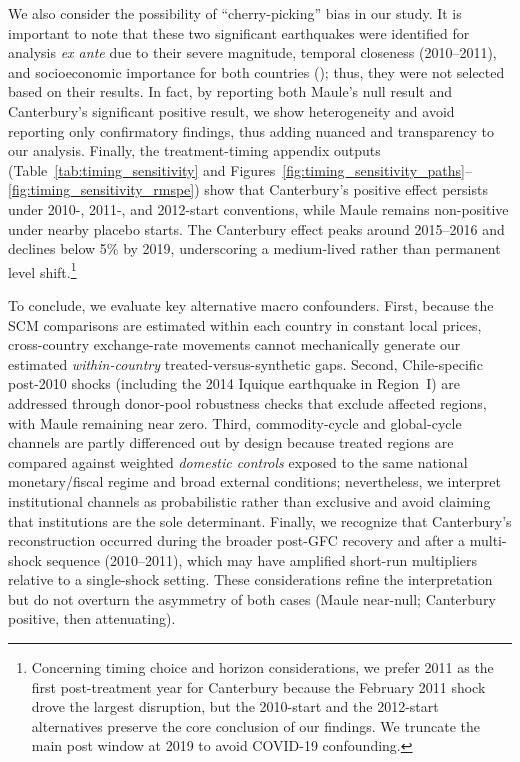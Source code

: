 \documentclass[12pt]{article}
\begin{document}
We also consider the possibility of “cherry-picking” bias \autocite{ferman2020cherry} in our study. It is important to note that these two significant earthquakes were identified for analysis \textit{ ex ante} due to their severe magnitude, temporal closeness (2010–2011), and socioeconomic importance for both countries (\cite{dussaillant2014trust, cardenasjiron2012chilean, eqc2017annual, miller2013estimating}); thus, they were not selected based on their results. In fact, by reporting both Maule’s null result and Canterbury's significant positive result, we show heterogeneity and avoid reporting only confirmatory findings, thus adding nuanced and transparency to our analysis. Finally, the treatment-timing appendix outputs (Table~\ref{tab:timing_sensitivity} and Figures~\ref{fig:timing_sensitivity_paths}--\ref{fig:timing_sensitivity_rmspe}) show that Canterbury’s positive effect persists under 2010-, 2011-, and 2012-start conventions, while Maule remains non-positive under nearby placebo starts. The Canterbury effect peaks around 2015--2016 and declines below 5\% by 2019, underscoring a medium-lived rather than permanent level shift.\footnote{Concerning timing choice and horizon considerations, we prefer 2011 as the first post-treatment year for Canterbury because the February 2011 shock drove the largest disruption, but the 2010-start and the 2012-start alternatives preserve the core conclusion of our findings. We truncate the main post window at 2019 to avoid COVID-19 confounding.}

To conclude, we evaluate key alternative macro confounders. First, because the SCM comparisons are estimated within each country in constant local prices, cross-country exchange-rate movements cannot mechanically generate our estimated \emph{within-country} treated-versus-synthetic gaps. Second, Chile-specific post-2010 shocks (including the 2014 Iquique earthquake in Region~I) are addressed through donor-pool robustness checks that exclude affected regions, with Maule remaining near zero. Third, commodity-cycle and global-cycle channels are partly differenced out by design because treated regions are compared against weighted \textit{domestic controls} exposed to the same national monetary/fiscal regime and broad external conditions; nevertheless, we interpret institutional channels as probabilistic rather than exclusive and avoid claiming that institutions are the sole determinant. Finally, we recognize that Canterbury’s reconstruction occurred during the broader post-GFC recovery and after a multi-shock sequence (2010--2011), which may have amplified short-run multipliers relative to a single-shock setting. These considerations refine the interpretation but do not overturn the asymmetry of both cases (Maule near-null; Canterbury positive, then attenuating).
\end{document}
